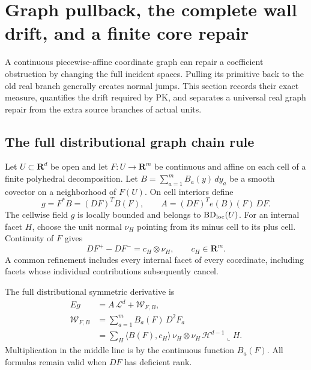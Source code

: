 \section{Graph pullback, the complete wall drift, and a finite core repair}
\label{sec:r13-graph-pullback-wall-drift}

A continuous piecewise-affine coordinate graph can repair a
coefficient obstruction by changing the full incident spaces.
Pulling its primitive back to the old real branch generally
creates normal jumps.  This section records their exact measure,
quantifies the drift required by PK, and separates a universal
real graph repair from the extra source branches of actual units.

\subsection{The full distributional graph chain rule}

Let \(U\subset\mathbf R^d\) be open and let
\(F:U\to\mathbf R^m\) be continuous and affine on each
cell of a finite polyhedral decomposition.  Let
\(B=\sum_{a=1}^m B_a(y)\,dy_a\) be a smooth covector on a
neighborhood of \(F(U)\).  On cell interiors define
\[
 g=F^*B=(DF)^TB(F),\qquad
 A=(DF)^T e(B)(F)\,DF.
 \tag{GD1}
\]
The cellwise field \(g\) is locally bounded and belongs to
\(\mathrm{BD}_{\rm loc}(U)\).  For an internal facet \(H\),
choose the unit normal \(\nu_H\) pointing from its minus
cell to its plus cell.  Continuity of \(F\) gives
\[
             DF^+-DF^-=c_H\otimes\nu_H,
                       \qquad c_H\in\mathbf R^m.
 \tag{GD2}
\]
A common refinement includes every internal facet of every
coordinate, including facets whose individual contributions
subsequently cancel.

\begin{proposition}
\label{prop:r13-graph-full-strain-chain-rule}
The full distributional symmetric derivative is
\[
 \begin{split}
 Eg&=A\,\mathcal L^d+\mathcal W_{F,B},\\
 \mathcal W_{F,B}
    &=\sum_{a=1}^m B_a(F)\,D^2F_a\\
    &=\sum_H\langle B(F),c_H\rangle\,
             \nu_H\otimes\nu_H\,
                     \mathcal H^{d-1}\!\llcorner H.
 \end{split}
 \tag{GD3}
\]
Multiplication in the middle line is by the continuous
function \(B_a(F)\).  All formulas remain valid when
\(DF\) has deficient rank.
\end{proposition}

